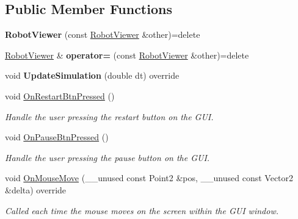 \subsection*{Public Member Functions}
\begin{DoxyCompactItemize}
\item 
\mbox{\label{classRobotViewer_a722235e9d5cc60161e15dd189bf79566}} 
{\bfseries Robot\+Viewer} (const \hyperlink{classRobotViewer}{Robot\+Viewer} \&other)=delete
\item 
\mbox{\label{classRobotViewer_a4e7109141d452ea091e776d0069e03fb}} 
\hyperlink{classRobotViewer}{Robot\+Viewer} \& {\bfseries operator=} (const \hyperlink{classRobotViewer}{Robot\+Viewer} \&other)=delete
\item 
\mbox{\label{classRobotViewer_a05c15913e55cd6925a089ce7c1fa5a55}} 
void {\bfseries Update\+Simulation} (double dt) override
\item 
\mbox{\label{classRobotViewer_a53b22985d65f9d2feb02deef32346030}} 
void \hyperlink{classRobotViewer_a53b22985d65f9d2feb02deef32346030}{On\+Restart\+Btn\+Pressed} ()
\begin{DoxyCompactList}\small\item\em Handle the user pressing the restart button on the G\+UI. \end{DoxyCompactList}\item 
\mbox{\label{classRobotViewer_ac1797fc2a436b9e176baf526ca9e9936}} 
void \hyperlink{classRobotViewer_ac1797fc2a436b9e176baf526ca9e9936}{On\+Pause\+Btn\+Pressed} ()
\begin{DoxyCompactList}\small\item\em Handle the user pressing the pause button on the G\+UI. \end{DoxyCompactList}\item 
void \hyperlink{classRobotViewer_ae3b11d89a8f596d43bd7127ed7cfccf5}{On\+Mouse\+Move} (\+\_\+\+\_\+unused const Point2 \&pos, \+\_\+\+\_\+unused const Vector2 \&delta) override
\begin{DoxyCompactList}\small\item\em Called each time the mouse moves on the screen within the G\+UI window. \end{DoxyCompactList}\item 

\end{DoxyCompactItemize}
